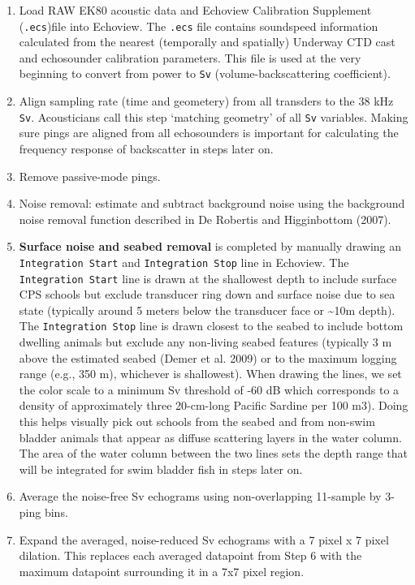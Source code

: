 \documentclass[
  letterpaper,
  oneside,
  open=any]{scrbook}
\begin{document}
\begin{enumerate}
\def\labelenumi{\arabic{enumi}.}
\item
  Load RAW EK80 acoustic data and Echoview Calibration Supplement
  (\texttt{.ecs})file into Echoview. The \texttt{.ecs} file contains
  soundspeed information calculated from the nearest (temporally and
  spatially) Underway CTD cast and echosounder calibration parameters.
  This file is used at the very beginning to convert from power to
  \texttt{Sv} (volume-backscattering coefficient).
\item
  Align sampling rate (time and geometery) from all transders to the 38
  kHz \texttt{Sv}. Acousticians call this step `matching geometry' of
  all \texttt{Sv} variables. Making sure pings are aligned from all
  echosounders is important for calculating the frequency response of
  backscatter in steps later on.
\item
  Remove passive-mode pings.
\item
  Noise removal: estimate and subtract background noise using the
  background noise removal function described in De Robertis and
  Higginbottom (2007).
\item
  \textbf{Surface noise and seabed removal} is completed by manually
  drawing an \texttt{Integration\ Start} and \texttt{Integration\ Stop}
  line in Echoview. The \texttt{Integration\ Start} line is drawn at the
  shallowest depth to include surface CPS schools but exclude transducer
  ring down and surface noise due to sea state (typically around 5
  meters below the transducer face or \textasciitilde10m depth). The
  \texttt{Integration\ Stop} line is drawn closest to the seabed to
  include bottom dwelling animals but exclude any non-living seabed
  features (typically 3 m above the estimated seabed (Demer et al. 2009)
  or to the maximum logging range (e.g., 350 m), whichever is
  shallowest). When drawing the lines, we set the color scale to a
  minimum Sv threshold of -60 dB which corresponds to a density of
  approximately three 20-cm-long Pacific Sardine per 100 m3). Doing this
  helps visually pick out schools from the seabed and from non-swim
  bladder animals that appear as diffuse scattering layers in the water
  column. The area of the water column between the two lines sets the
  depth range that will be integrated for swim bladder fish in steps
  later on.
\item
  Average the noise-free Sv echograms using non-overlapping 11-sample by
  3-ping bins.
\item
  Expand the averaged, noise-reduced Sv echograms with a 7 pixel x 7
  pixel dilation. This replaces each averaged datapoint from Step 6 with
  the maximum datapoint surrounding it in a 7x7 pixel region.
\end{enumerate}
\end{document}
